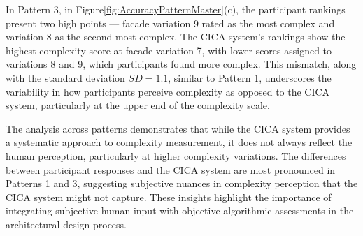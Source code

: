 In Pattern 3,  in Figure\ref{fig:AccuracyPatternMaster}(c), the participant rankings present two high points — facade variation 9 rated as the most complex and variation 8 as the second most complex.
The CICA system's rankings show the highest complexity score at facade variation 7, with lower scores assigned to variations 8 and 9, which participants found more complex.
This mismatch, along with the standard deviation \(SD = 1.1\), similar to Pattern 1, underscores the variability in how participants perceive complexity as opposed to the CICA system, particularly at the upper end of the complexity scale.

The analysis across patterns demonstrates that while the CICA system provides a systematic approach to complexity measurement, it does not always reflect the human perception, particularly at higher complexity variations.
The differences between participant responses and the CICA system are most pronounced in Patterns 1 and 3, suggesting subjective nuances in complexity perception that the CICA system might not capture.
These insights highlight the importance of integrating subjective human input with objective algorithmic assessments in the architectural design process.



